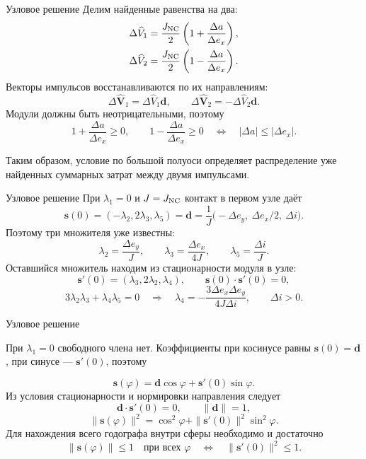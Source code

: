 \documentclass[11pt,aspectratio=169,t]{beamer}
\newcommand{\derivationmathspacing}{%
  \setlength{\abovedisplayskip}{2pt}%
  \setlength{\belowdisplayskip}{3pt}%
  \setlength{\abovedisplayshortskip}{2pt}%
  \setlength{\belowdisplayshortskip}{2pt}%
  \setlength{\jot}{2pt}}
\begin{document}
\begin{frame}{Узловое решение}
\relax
\derivationmathspacing
Делим найденные равенства на два:
\[
\begin{aligned}
\Delta\widehat V_1&=\frac{J_{\rm NC}}2
 \left(1+\frac{\Delta a}{\Delta e_x}\right),\\
\Delta\widehat V_2&=\frac{J_{\rm NC}}2
 \left(1-\frac{\Delta a}{\Delta e_x}\right).
\end{aligned}
\]
Векторы импульсов восстанавливаются по их направлениям:
\[
\Delta\widehat{\boldsymbol V}_1=\Delta\widehat V_1\boldsymbol d,
\qquad
\Delta\widehat{\boldsymbol V}_2=-\Delta\widehat V_2\boldsymbol d.
\]
Модули должны быть неотрицательными, поэтому
\[
1+\frac{\Delta a}{\Delta e_x}\geq0,\qquad
1-\frac{\Delta a}{\Delta e_x}\geq0
\quad\Longleftrightarrow\quad
|\Delta a|\leq|\Delta e_x|.
\]
{\justifying
Таким образом, условие по большой полуоси определяет распределение
уже найденных суммарных затрат между двумя импульсами.
\par}
\end{frame}

\begin{frame}{Узловое решение}
\relax
\derivationmathspacing
При $\lambda_1=0$ и $J=J_{\rm NC}$ контакт в первом узле даёт
\[
\boldsymbol s(0)=(-\lambda_2,2\lambda_3,\lambda_5)
 =\boldsymbol d=\frac1J
 \bigl(-\Delta e_y,\ \Delta e_x/2,\ \Delta i\bigr).
\]
Поэтому три множителя уже известны:
\[
\lambda_2=\frac{\Delta e_y}{J},\qquad
\lambda_3=\frac{\Delta e_x}{4J},\qquad
\lambda_5=\frac{\Delta i}{J}.
\]
Оставшийся множитель находим из стационарности модуля в узле:
\[
\boldsymbol s'(0)=(\lambda_3,2\lambda_2,\lambda_4),\qquad
\boldsymbol s(0)\mathbin\cdot\boldsymbol s'(0)=0,
\]
\[
3\lambda_2\lambda_3+\lambda_4\lambda_5=0
\quad\Longrightarrow\quad
\lambda_4=-\frac{3\Delta e_x\Delta e_y}{4J\Delta i},
\qquad \Delta i>0.
\]
\end{frame}

\begin{frame}{Узловое решение}
\relax
\derivationmathspacing
{\justifying
При $\lambda_1=0$ свободного члена нет. Коэффициенты при косинусе
равны $\boldsymbol s(0)=\boldsymbol d$, при синусе ---
$\boldsymbol s'(0)$, поэтому
\par}
\[
\boldsymbol s(\varphi)
 =\boldsymbol d\cos\varphi+\boldsymbol s'(0)\sin\varphi.
\]
Из условия стационарности и нормировки направления следует
\[
\boldsymbol d\mathbin\cdot\boldsymbol s'(0)=0,
\qquad \|\boldsymbol d\|=1,
\]
\[
\|\boldsymbol s(\varphi)\|^2
 =\cos^2\varphi+\|\boldsymbol s'(0)\|^2\sin^2\varphi.
\]
Для нахождения всего годографа внутри сферы необходимо и достаточно
\[
\|\boldsymbol s(\varphi)\|\leq1\quad\text{при всех }\varphi
\quad\Longleftrightarrow\quad
\|\boldsymbol s'(0)\|^2\leq1.
\]
\end{frame}
\end{document}
